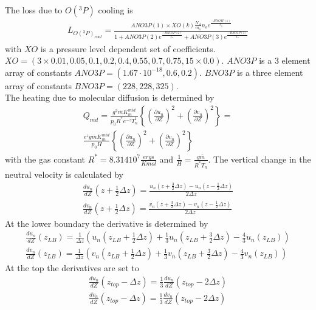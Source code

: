 %
\\
The loss due to $O(^3P)$ cooling is
%
\begin{align}
  L_{O(^3P)_{cool}} = \frac{ANO3P(1) \times XO(k) \frac{N_A}{m_o} n_o
  e^{\frac{-BNO3P(1)}{T_n}}}{1+ANO3P(2) e^{\frac{-BNO3P(2)}{T_n}}+ANO3P(3)
  e^{\frac{-BNO3P(3)}{T_n}}}
\end{align}
%
with $XO$ is a pressure level dependent set of coefficients. $XO = (3 \times 0.01,
0.05,0.1,0.2,0.4,0.55,0.7,0.75,15\times 0.0)$. $ANO3P$ is a 3 element array of
constants $ANO3P = (1.67 \cdot 10^{-18},0.6,0.2)$. $BNO3P$ is a three element array
of constants $BNO3P = (228,228,325)$.
\\

The heating due to molecular diffusion is determined by
%
\begin{align}
  Q_{md} = \frac{g^2 \overline{m} K_m^{mid}}{p_0 R^* e^{-z} T_n^t}
  \left\{ \left(\frac{\partial u_n}{\partial Z}\right)^2 +
  \left(\frac{\partial v_n}{\partial Z}\right)^2 \right\} = \\
  \frac{e^z g \overline{m} K_m^{mid}}{p_0 H}
  \left\{ \left(\frac{\partial u_n}{\partial Z}\right)^2 +
  \left(\frac{\partial v_n}{\partial Z}\right)^2 \right\}
\end{align}
%
with the gas constant $R^* = 8.314 10^7 \frac{ergs}{K mol}$ and
$\frac{1}{H}= \frac{g \overline{m}}{R^* T_n}$. The vertical change
in the neutral velocity is calculated by
%
\begin{align}
  \frac{d u_n}{d Z}(z + \frac{1}{2}\Delta z) = \frac{u_n(z + \frac{3}{2}\Delta z ) -
                                               u_n(z - \frac{1}{2}\Delta z )}{2 \Delta
                                               z} \\
  \frac{d v_n}{d Z}(z + \frac{1}{2}\Delta z) = \frac{v_n(z + \frac{3}{2}\Delta z ) -
                                               v_n(z - \frac{1}{2}\Delta z )}{2 \Delta
                                               z}
\end{align}
%
At the lower boundary the derivative is determined by
%
\begin{align}
  \frac{d u_n}{d Z}(z_{LB}) = \frac{1}{\Delta z}\left( u_n(z_{LB} + \frac{1}{2}\Delta z)
        + \frac{1}{3} u_n(z_{LB} + \frac{3}{2}\Delta z) -
        \frac{4}{3} u_n(z_{LB})\right) \\
  \frac{d v_n}{d Z}(z_{LB}) = \frac{1}{\Delta z}\left( v_n(z_{LB} + \frac{1}{2}\Delta z)
        + \frac{1}{3} v_n(z_{LB} + \frac{3}{2}\Delta z) -
        \frac{4}{3} v_n(z_{LB})\right)
\end{align}
%
At the top the derivatives are set to
%
\begin{align}
  \frac{d u_n}{d Z}(z_{top}-\Delta z) = \frac{1}{3}\frac{d u_n}{d Z}(z_{top}-2 \Delta z) \\
  \frac{d v_n}{d Z}(z_{top}-\Delta z) = \frac{1}{3}\frac{d v_n}{d Z}(z_{top}-2 \Delta z)
\end{align}
%
\\

